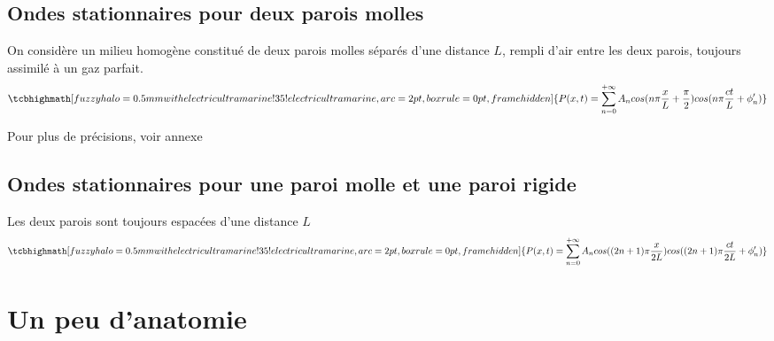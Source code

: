 \subsection{Ondes stationnaires pour deux parois molles}
On considère un milieu homogène constitué de deux parois molles séparés d'une distance $L$, rempli d'air entre les deux parois, toujours assimilé à un gaz parfait.
\begin{equation}
    \normalsize
    \tcbhighmath[fuzzy halo=0.5mm with electricultramarine!35!electricultramarine,arc=2pt,
    boxrule=0pt,frame hidden]{ 
        P(x,t) = \sum_{n=0}^{+\infty}{A_{n}cos(n\pi \frac{x}{L} + \frac{\pi}{2})cos(n\pi \frac{ct}{L} + \phi_{n}')}
     } \nonumber
    \normalsize
\end{equation}
\vfill
\begin{center}
    \small
    Pour plus de précisions, voir annexe 
    \normalsize
\end{center}
\newpage
\subsection{Ondes stationnaires pour une paroi molle et une paroi rigide}
Les deux parois sont toujours espacées d'une distance $L$
\begin{equation}
    \normalsize
    \tcbhighmath[fuzzy halo=0.5mm with electricultramarine!35!electricultramarine,arc=2pt,
    boxrule=0pt,frame hidden]{ 
        P(x,t) = \sum_{n=0}^{+\infty}{A_{n}cos((2n+1)\pi\frac{x}{2L} )cos((2n + 1)\pi \frac{ct}{2L} + \phi_{n}')}
     } \nonumber
    \normalsize
\end{equation}
\section{Un peu d'anatomie}
